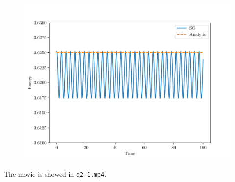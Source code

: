 \documentclass{article}
\begin{document}
\begin{enumerate}[1.]
\begin{enumerate}[(i)]
\begin{figure}[H]
\begin{minipage}{0.32\linewidth}
      \end{minipage}
      \begin{minipage}{0.32\linewidth}
        \centering
        \includegraphics[width=\linewidth]{q2-1_time_energy.pdf}
      \end{minipage}
      \caption{}
      \label{fig:2-1}
    \end{figure}
    The movie is showed in \texttt{q2-1.mp4}.


\end{enumerate}
\end{enumerate}
\end{document}
